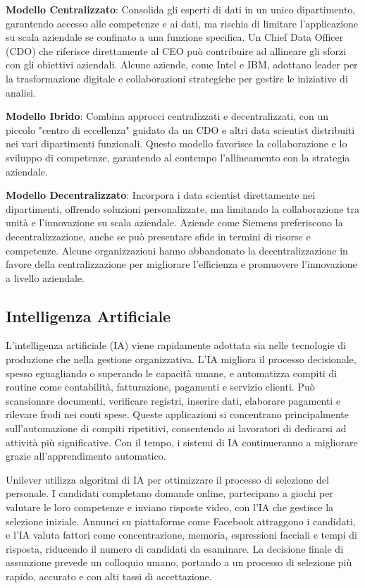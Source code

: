 \documentclass{article}
\begin{document}
\textbf{Modello Centralizzato}: Consolida gli esperti di dati in un unico dipartimento, garantendo accesso alle competenze e ai dati, ma rischia di limitare l'applicazione su scala aziendale se confinato a una funzione specifica. Un Chief Data Officer (CDO) che riferisce direttamente al CEO può contribuire ad allineare gli sforzi con gli obiettivi aziendali. Alcune aziende, come Intel e IBM, adottano leader per la trasformazione digitale e collaborazioni strategiche per gestire le iniziative di analisi.

\textbf{Modello Ibrido}: Combina approcci centralizzati e decentralizzati, con un piccolo "centro di eccellenza" guidato da un CDO e altri data scientist distribuiti nei vari dipartimenti funzionali. Questo modello favorisce la collaborazione e lo sviluppo di competenze, garantendo al contempo l'allineamento con la strategia aziendale.

\textbf{Modello Decentralizzato}: Incorpora i data scientist direttamente nei dipartimenti, offrendo soluzioni personalizzate, ma limitando la collaborazione tra unità e l'innovazione su scala aziendale. Aziende come Siemens preferiscono la decentralizzazione, anche se può presentare sfide in termini di risorse e competenze. Alcune organizzazioni hanno abbandonato la decentralizzazione in favore della centralizzazione per migliorare l'efficienza e promuovere l'innovazione a livello aziendale.


\subsection{Intelligenza Artificiale}

L'intelligenza artificiale (IA) viene rapidamente adottata sia nelle tecnologie di produzione che nella gestione organizzativa. L'IA migliora il processo decisionale, spesso eguagliando o superando le capacità umane, e automatizza compiti di routine come contabilità, fatturazione, pagamenti e servizio clienti. Può scansionare documenti, verificare registri, inserire dati, elaborare pagamenti e rilevare frodi nei conti spese. Queste applicazioni si concentrano principalmente sull'automazione di compiti ripetitivi, consentendo ai lavoratori di dedicarsi ad attività più significative. Con il tempo, i sistemi di IA continueranno a migliorare grazie all'apprendimento automatico.

Unilever utilizza algoritmi di IA per ottimizzare il processo di selezione del personale. I candidati completano domande online, partecipano a giochi per valutare le loro competenze e inviano risposte video, con l'IA che gestisce la selezione iniziale. Annunci su piattaforme come Facebook attraggono i candidati, e l'IA valuta fattori come concentrazione, memoria, espressioni facciali e tempi di risposta, riducendo il numero di candidati da esaminare. La decisione finale di assunzione prevede un colloquio umano, portando a un processo di selezione più rapido, accurato e con alti tassi di accettazione.
\end{document}
